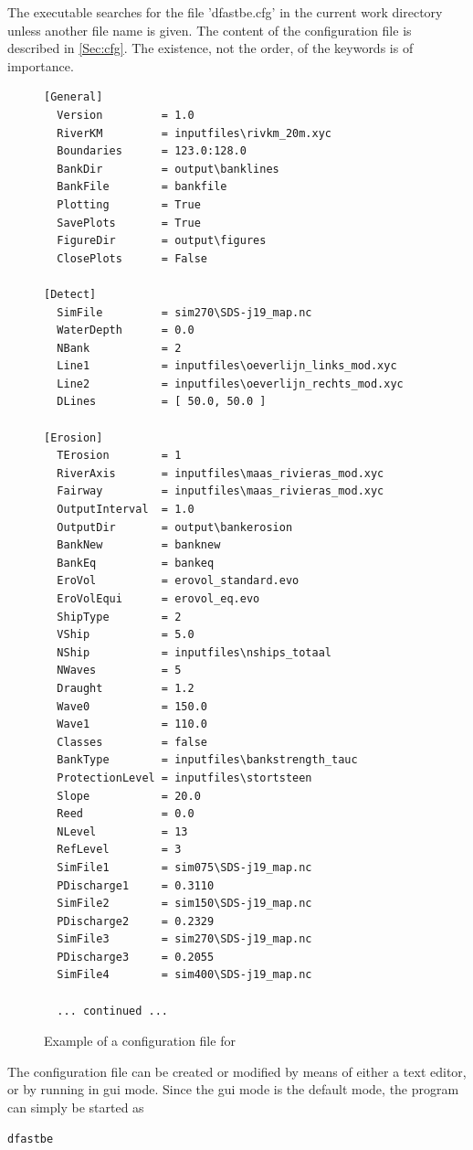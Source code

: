 The executable searches for the file 'dfastbe.cfg' in the current work directory unless another file name is given.
The content of the configuration file is described in \autoref{Sec:cfg}.
The existence, not the order, of the keywords is of importance.

\begin{figure}
\begin{verbatim}
[General]
  Version         = 1.0
  RiverKM         = inputfiles\rivkm_20m.xyc
  Boundaries      = 123.0:128.0
  BankDir         = output\banklines
  BankFile        = bankfile
  Plotting        = True
  SavePlots       = True
  FigureDir       = output\figures
  ClosePlots      = False

[Detect]
  SimFile         = sim270\SDS-j19_map.nc
  WaterDepth      = 0.0
  NBank           = 2
  Line1           = inputfiles\oeverlijn_links_mod.xyc
  Line2           = inputfiles\oeverlijn_rechts_mod.xyc
  DLines          = [ 50.0, 50.0 ]

[Erosion]
  TErosion        = 1
  RiverAxis       = inputfiles\maas_rivieras_mod.xyc
  Fairway         = inputfiles\maas_rivieras_mod.xyc
  OutputInterval  = 1.0
  OutputDir       = output\bankerosion
  BankNew         = banknew
  BankEq          = bankeq
  EroVol          = erovol_standard.evo
  EroVolEqui      = erovol_eq.evo
  ShipType        = 2
  VShip           = 5.0
  NShip           = inputfiles\nships_totaal
  NWaves          = 5
  Draught         = 1.2
  Wave0           = 150.0
  Wave1           = 110.0
  Classes         = false
  BankType        = inputfiles\bankstrength_tauc
  ProtectionLevel = inputfiles\stortsteen
  Slope           = 20.0
  Reed            = 0.0
  NLevel          = 13
  RefLevel        = 3
  SimFile1        = sim075\SDS-j19_map.nc
  PDischarge1     = 0.3110
  SimFile2        = sim150\SDS-j19_map.nc
  PDischarge2     = 0.2329
  SimFile3        = sim270\SDS-j19_map.nc
  PDischarge3     = 0.2055
  SimFile4        = sim400\SDS-j19_map.nc

  ... continued ...
\end{verbatim}
\caption{Example of a configuration file for \dfastbe}
\label{Fig2.1}
\end{figure}

The configuration file can be created or modified by means of either a text editor, or by \dfastbe running in gui mode.
Since the gui mode is the default mode, the program can simply be started as

\begin{Verbatim}
dfastbe
\end{Verbatim}

